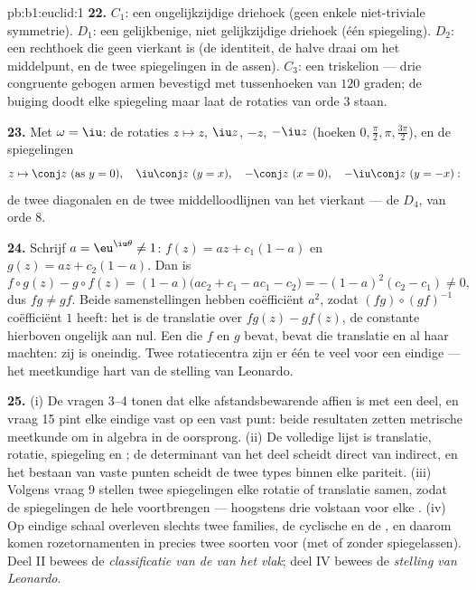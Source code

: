 \begin{solution}{pb:b1:euclid:1}
\textbf{22.} $C_1$: een ongelijkzijdige driehoek (geen enkele
niet-triviale symmetrie). $D_1$: een gelijkbenige, niet
gelijkzijdige driehoek (één spiegeling). $D_2$: een rechthoek die
geen vierkant is (de identiteit, de halve draai om het middelpunt,
en de twee spiegelingen in de assen). $C_3$: een triskelion ---
drie congruente gebogen armen bevestigd met tussenhoeken van $120$
graden; de buiging doodt elke spiegeling maar laat de rotaties van
orde $3$ staan.

\textbf{23.} Met $\omega = \iu$: de rotaties $z \mapsto z$, $\iu
z$, $-z$, $-\iu z$ (hoeken $0, \frac\pi2, \pi, \frac{3\pi}2$), en
de spiegelingen
\[
z \mapsto \conj z \ (\text{as } y = 0), \quad
\iu\conj z \ (y = x), \quad
-\conj z \ (x = 0), \quad
-\iu\conj z \ (y = -x):
\]
de twee diagonalen en de twee middelloodlijnen van het vierkant ---
de  $D_4$, van orde $8$.

\textbf{24.} Schrijf $a = \eu^{\iu\theta} \neq 1$: $f(z) = az +
c_1(1 - a)$ en $g(z) = az + c_2(1 - a)$. Dan is
\[
f\circ g(z) - g\circ f(z)
= (1-a)\bigl(ac_2 + c_1 - ac_1 - c_2\bigr)
= -(1 - a)^2(c_2 - c_1) \neq 0 ,
\]
dus $f g \neq g f$. Beide samenstellingen hebben 
coëfficiënt $a^2$, zodat $(fg)\circ(gf)^{-1}$  coëfficiënt
$1$ heeft: het is de translatie over $fg(z) - gf(z)$, de constante
hierboven ongelijk aan nul. Een  die $f$ en $g$ bevat, bevat
die translatie en al haar machten: zij is oneindig. Twee
rotatiecentra zijn er één te veel voor een eindige  --- het
meetkundige hart van de stelling van Leonardo.

\textbf{25.} (i) De vragen 3--4 tonen dat elke afstandsbewarende
 affien is met een   deel, en vraag 15
pint elke eindige  vast op een vast punt: beide resultaten
zetten metrische meetkunde om in  algebra in de oorsprong.
(ii) De volledige lijst is translatie, rotatie, spiegeling en
; de determinant van het  deel scheidt direct
van indirect, en het bestaan van vaste punten scheidt de twee types
binnen elke pariteit. (iii) Volgens vraag 9 stellen twee
spiegelingen elke rotatie of translatie samen, zodat de
spiegelingen de hele  voortbrengen --- hoogstens drie
volstaan voor elke . (iv) Op eindige schaal overleven
slechts twee families, de cyclische en de , en daarom
komen rozetornamenten in precies twee soorten voor (met of zonder
spiegelassen). Deel II bewees de \emph{classificatie van de
 van het vlak}; deel IV bewees de \emph{stelling van
Leonardo}.
\end{solution}
